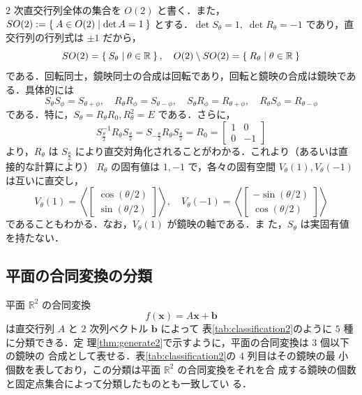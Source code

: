 \documentclass[11pt, uplatex, dvipdfmx, titlepage]{jsarticle}
\theoremstyle{definition}
\begin{document}
$2$ 次直交行列全体の集合を $O(2)$ と書く．また，$SO(2) := \Set{A \in
  O(2) | \det A = 1}$ とする．$\det S_{\theta} =1, \; \det
R_{\theta}=-1$ であり，直交行列の行列式は $\pm 1$ だから，
\[
  SO(2) = \Set{ S_{\theta} | \theta \in \mathbb{R}}, \quad O(2)
  \setminus SO(2)=\Set{ R_{\theta} | \theta \in \mathbb{R}}
\]
である．回転同士，鏡映同士の合成は回転であり，回転と鏡映の合成は鏡映である．具体的には
\[
  S_{\theta} S_{\phi} = S_{\theta+\phi}, \quad R_{\theta} R_{\phi} = S_{\theta-\phi}, \quad
  S_{\theta}R_{\phi}=R_{\theta+\phi}, \quad R_{\theta}S_{\phi} = R_{\theta-\phi}
\]
である．特に，$S_{\theta} = R_{\theta}R_{0}, R_{\theta}^2=E$ である．さらに，
\[
  S_{\frac{\theta}{2}}^{-1} R_{\theta} S_{\frac{\theta}{2}} = S_{-\frac{\theta}{2}} R_{\theta} S_{\frac{\theta}{2}}
  = R_{0} = \left[
    \begin{array}{rr}
      1 & 0\\
      0 & -1
    \end{array}
  \right]
\]
より，$R_{\theta}$ は $S_{\frac{\theta}{2}}$ により直交対角化されることがわかる．これより（あるいは直接的な計算により）
$R_{\theta}$ の固有値は $1, -1$ で，各々の固有空間 $V_{\theta}(1), V_{\theta}(-1)$ は互いに直交し，
\[
  V_{\theta}(1) = \left\langle \left[
    \begin{array}{r}
      \cos (\theta/2)\\
      \sin (\theta/2)
    \end{array}
  \right]\right\rangle, \quad V_{\theta}(-1)= \left\langle \left[
    \begin{array}{r}
      -\sin (\theta/2)\\
      \cos (\theta/2)
    \end{array}
  \right]\right\rangle
\] 
であることもわかる．なお，$V_{\theta}(1)$ が鏡映の軸である．ま
た，$S_{\theta}$ は実固有値を持たない．


\subsection{平面の合同変換の分類}\label{sec:classification2}

平面 $\mathbb{R}^2$ の合同変換
\[
  f(\bm{x}) = A \bm{x} + \bm{b}
\]
は直交行列 $A$ と $2$ 次列ベクトル $\bm{b}$ によって
表\ref{tab:classification2}のように $5$ 種に分類できる．定
理\ref{thm:generate2}で示すように，平面の合同変換は $3$ 個以下の鏡映の
合成として表せる．表\ref{tab:classification2}の $4$ 列目はその鏡映の最
小個数を表しており，この分類は平面 $\mathbb{R}^2$ の合同変換をそれを合
成する鏡映の個数と固定点集合によって分類したものとも一致してい
る．
\end{document}

